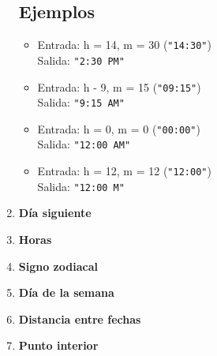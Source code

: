 \begin{enumerate}
    \subsection*{Ejemplos}
    \begin{itemize}
        \item Entrada: h = 14, m = 30 (\texttt{"14:30"})\\
              Salida: \texttt{"2:30 PM"}
        \item Entrada: h - 9, m = 15 (\texttt{"09:15"})\\
              Salida: \texttt{"9:15 AM"}
        \item Entrada: h = 0, m = 0 (\texttt{"00:00"})\\
              Salida: \texttt{"12:00 AM"}
        \item Entrada: h = 12, m = 12 (\texttt{"12:00"})\\
              Salida: \texttt{"12:00 M"}
    \end{itemize}

    \item \textbf{Día siguiente}\\
    

    \item \textbf{Horas}
    

    \item \textbf{Signo zodiacal}\\
    

    \item \textbf{Día de la semana}\\
    

    \item \textbf{Distancia entre fechas}\\
    

    \item \textbf{Punto interior}\\
    
\end{enumerate}

\newpage
